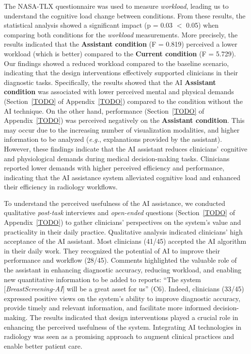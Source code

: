 The \ac{NASA-TLX} questionnaire was used to measure {\it workload}, leading us to understand the cognitive load change between conditions.
From these results, the statistical analysis showed a significant impact (p = 0.03 $<$ 0.05) when comparing both conditions for the {\it workload} measurements.
More precisely, the results indicated that the {\bf Assistant condition} (F = 0.819) perceived a lower workload (which is better) compared to the {\bf Current condition} (F = 5.729).
Our findings showed a reduced workload compared to the baseline scenario, indicating that the design interventions effectively supported clinicians in their diagnostic tasks.
Specifically, the results showed that the \ac{AI} {\bf Assistant condition} was associated with lower perceived mental and physical demands (Section~\ref{TODO} of Appendix~\ref{TODO}) compared to the condition without the AI technique.
On the other hand, performance (Section~\ref{TODO} of Appendix~\ref{TODO}) was perceived negatively on the {\bf Assistant condition}.
This may occur due to the increasing number of visualization modalities, and higher information to be analyzed ({\it e.g.}, explanations provided by the assistant).
However, these findings indicate that the \ac{AI} assistant reduces clinicians' cognitive and physiological demands during medical decision-making tasks.
Clinicians reported lower demands with higher perceived efficiency and performance, indicating that the \ac{AI} assistance system alleviated cognitive load and enhanced their efficiency in radiology workflows.

To understand the perceived usefulness of the \ac{AI} assistance, we conducted qualitative {\it post-task} interviews and {\it open-ended} questions (Section~\ref{TODO} of Appendix~\ref{TODO}) to gather clinicians' perspectives on the system's value and practicality in their daily practice.
Qualitative analysis indicated clinicians' high acceptance of the \ac{AI} assistant.
Most clinicians (41/45) accepted the \ac{AI} algorithm in their daily work.
They recognized the potential of \ac{AI} to improve their performance and workflow (28/45).
Comments highlighted the valuable role of the assistant in enhancing diagnostic accuracy, reducing workload, and enabling new quantitative information to be added to reports: ``The system [{\it BreastScreening-AI}] will be a great asset for us'' (C6).
Indeed, clinicians (33/45) expressed positive views on the system's ability to improve diagnostic accuracy, provide timely and relevant information, and facilitate more informed decision-making.
The results indicated that design interventions played a crucial role in enhancing the perceived usefulness of the system.
Integrating \ac{AI} technologies in radiology was seen as a promising approach to augment clinical practices and enable better patient care.

